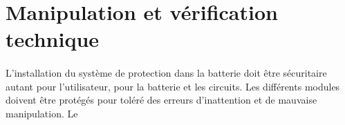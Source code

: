 \section{Manipulation et vérification technique}
\paragraph*{}
L'installation du système de protection dans la batterie doit être sécuritaire autant pour l'utilisateur, pour la batterie et les circuits. Les différents modules doivent être protégés pour toléré des erreurs d'inattention et de mauvaise manipulation. Le 